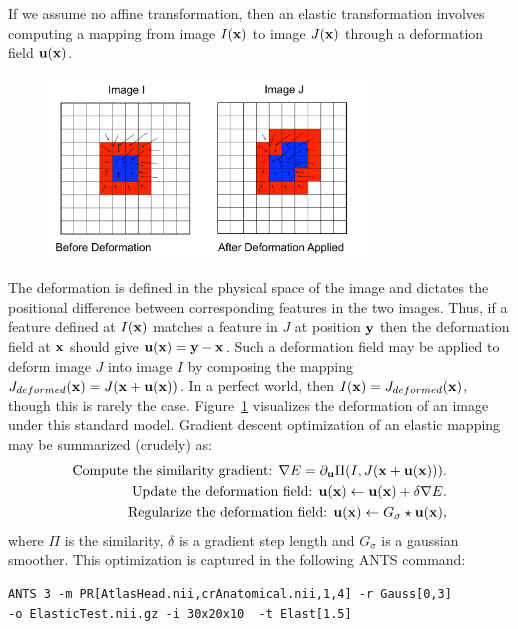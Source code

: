 \documentclass{InsightArticle}
\newcommand{\x}{{\bf x}}
\newcommand{\y}{{\bf y}}
\newcommand{\disp}{{\bf u}}
\begin{document}
 If we assume no affine transformation, then 
an elastic transformation involves computing a mapping from image $I(\x)$ to image $J(\x)$ 
through a deformation field $\disp( \x )$.  
\begin{figure}
\center \includegraphics[width=0.75\textwidth]{./Figures/PullBack.pdf} 
\label{fig:pull}
\end{figure}  
The deformation is defined in the physical space of the image 
and dictates the positional difference between corresponding features in the two images.  
Thus, if a feature defined at $I(\x)$ matches a feature in $J$ at position $\y$ then the deformation 
field at $\x$ should give $\disp ( \x )=\y-\x$.   
Such a deformation field may be applied to deform 
image $J$ into image $I$ by composing the mapping $J_{deformed}(\x)=J(\x+\disp(\x))$.  
In a perfect world, then $I(\x)=J_{deformed}(\x)$, though this is rarely the case.  Figure~\ref{fig:pull} 
visualizes the deformation of an image under this standard model. 
Gradient descent optimization of an elastic mapping may be summarized (crudely) as: 
\begin{align}
\text{Compute the similarity gradient:   }  \nabla E = \partial_{\disp} \Pi(I,J(\x+\disp(\x))). \nonumber \\
\text{Update the deformation field:  }  \disp(\x) \leftarrow \disp(\x)+\delta \nabla E. \nonumber \\ 
\text{Regularize the deformation field:  }  \disp(\x) \leftarrow G_\sigma \star \disp(\x),
\end{align}
where $\Pi$ is the similarity, $\delta$ is a gradient step length and $G_\sigma$ is a gaussian smoother.
This optimization is captured in the following ANTS command:
\begin{verbatim}
ANTS 3 -m PR[AtlasHead.nii,crAnatomical.nii,1,4] -r Gauss[0,3]  
-o ElasticTest.nii.gz -i 30x20x10  -t Elast[1.5] 
\end{verbatim}
\end{document}
